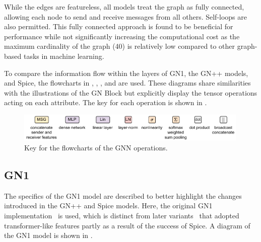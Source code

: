 While the edges are featureless, all models treat the graph as fully connected, allowing each node to send and receive messages from all others.
Self-loops are also permitted.
This fully connected approach is found to be beneficial for performance while not significantly increasing the computational cost as the maximum cardinality of the graph (40) is relatively low compared to other graph-based tasks in machine learning.

To compare the information flow within the layers of GN1, the GN++ models, and Spice, the flowcharts in , , , and  are used.
These diagrams share similarities with the illustrations of the GN Block  but explicitly display the tensor operations acting on each attribute.
The key for each operation is shown in .

\begin{figure}[h!]
    \centering
    \includegraphics[width=0.99\textwidth]{figures/flavour_tagging/key.pdf}
    \caption{Key for the flowcharts of the GNN operations.}
    \label{fig:key}
\end{figure}

\subsection{GN1}
\label{sec:gn1}

The specifics of the GN1 model are described to better highlight the changes introduced in the GN++ and Spice models.
Here, the original GN1 implementation~\cite{GN1} is used, which is distinct from later variants~\cite{SamThesis} that adopted transformer-like features partly as a result of the success of Spice.
A diagram of the GN1 model is shown in .

